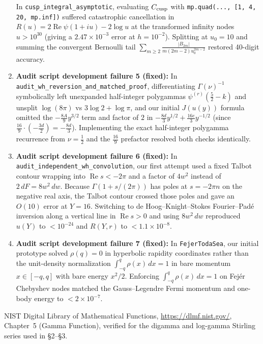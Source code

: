 \documentclass[11pt,a4paper]{article}
\begin{document}
\begin{enumerate}
In \texttt{cusp\_integral\_asymptotic}, evaluating $C_{\rm cusp}$ with
\texttt{mp.quad(..., [1, 4, 20, mp.inf])} suffered catastrophic cancellation in
$R(u)=2\operatorname{Re}\psi(1+iu)-2\log u$ at the transformed infinity nodes
$u>10^{30}$ (giving a $2.47\times 10^{-3}$ error at $h=10^{-2}$). Splitting at
$u_0=10$ and summing the convergent Bernoulli tail
$\sum_{m\ge 2}\frac{|B_{2m}|}{m(2m-2)u_0^{2m-2}}$ restored 40-digit accuracy.
\item \textbf{Audit script development failure 5 (fixed):}
In \texttt{audit\_wh\_reversion\_and\_matched\_proof}, differentiating
$\Gamma(\nu)^{-1}$ symbolically left unexpanded half-integer polygammas
$\psi^{(r)}(\frac52-k)$ and unsplit $\log(8\pi)$ vs $3\log 2+\log\pi$, and our
initial $J(u(y))$ formula omitted the $-\frac{8A}{9}y^{3/2}$ term and factor of
$2$ in $-\frac{8d}{3}y^{1/2}+\frac{16e}{3}y^{-1/2}$ (since
$\frac{16}{9}\cdot(-\frac{3d}{2})=-\frac{8d}{3}$). Implementing the exact
half-integer polygamma recurrence from $\nu=\frac12$ and the $\frac{16}{9}$
prefactor resolved both checks identically.
\item \textbf{Audit script development failure 6 (fixed):}
In \texttt{audit\_independent\_wh\_convolution}, our first attempt used a fixed
Talbot contour wrapping into $\operatorname{Re}s<-2\pi$ and a factor of $4w^2$
instead of $2\,dF=8w^2\,dw$. Because $\Gamma(1+s/(2\pi))$ has poles at
$s=-2\pi n$ on the negative real axis, the Talbot contour crossed those poles
and gave an $O(10)$ error at $Y=16$. Switching to de Hoog--Knight--Stokes
Fourier--Pad\'e inversion along a vertical line in $\operatorname{Re}s>0$ and
using $8w^2\,dw$ reproduced $u(Y)$ to $<10^{-24}$ and $R(Y,r)$ to $<1.1\times 10^{-8}$.
\item \textbf{Audit script development failure 7 (fixed):}
In \texttt{FejerTodaSea}, our initial prototype solved $\rho(q)=0$ in hyperbolic
rapidity coordinates rather than the unit-density normalization
$\int_{-q}^q\rho(x)\,dx=1$ in bare momentum $x\in[-q,q]$ with bare energy
$x^2/2$. Enforcing $\int_{-q}^q\rho(x)\,dx=1$ on Fej\'er Chebyshev nodes
matched the Gauss--Legendre Fermi momentum and one-body energy to $<2\times 10^{-7}$.
\end{enumerate}

\begin{thebibliography}{9}
NIST Digital Library of Mathematical Functions, \url{https://dlmf.nist.gov/},
Chapter~5 (Gamma Function), verified for the digamma and log-gamma Stirling
series used in \S2--\S3.
\end{thebibliography}
\end{document}
